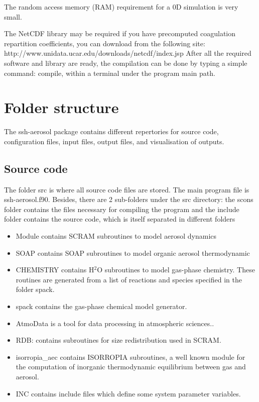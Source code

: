 \documentclass[a4paper,11pt]{article}
\begin{document}
The random access memory (RAM) requirement for a 0D simulation is very small. 

The NetCDF library may be required if you have precomputed coagulation repartition coefficients, you can download from the following site:
http://www.unidata.ucar.edu/downloads/netcdf/index.jsp
After all the required software and library are ready, the compilation can be done by typing a simple command: compile, within a terminal under the program main path.

\section{Folder structure}

The ssh-aerosol package contains different repertories for source code,  configuration files, input files, output files, and visualisation of outputs.

\subsection{Source code}
The folder src is where all source code files are stored. The main program file is ssh-aerosol.f90.  Besides, there are 2 sub-folders under the src directory: the scons folder contains the files necessary for compiling the program and the include folder contains the source code, which is itself separated in different folders
\begin{itemize}
\item Module contains SCRAM subroutines to model aerosol dynamics
\item SOAP contains SOAP subroutines to model organic aerosol thermodynamic
\item CHEMISTRY contains H$^2$O subroutines to model gas-phase chemistry. These routines are generated from a list of reactions and species specified in the folder spack.
\item spack contains the gas-phase chemical model generator.
     \item AtmoData is a tool for data processing in atmospheric sciences..
 \item RDB: contains subroutines for size redistribution used in SCRAM.
\item isorropia\_aec contains ISORROPIA subroutines, a well known module for the computation of inorganic thermodynamic equilibrium between gas and aerosol.
\item INC contains include files which define some system parameter variables.
\end {itemize}
\end{document}
